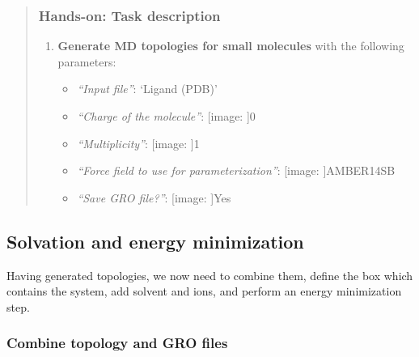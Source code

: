 \documentclass[twocolumn]{bmcart}%
\def\texttt{[image: ]}
\providecommand{\tightlist}{%
  \setlength{\itemsep}{0pt}\setlength{\parskip}{0pt}}
\begin{document}
\begin{quote}
\hypertarget{hands-on-task-description-2}{%
\subsubsection{Hands-on: Task
description}\label{hands-on-task-description-2}}

\begin{enumerate}
\def\labelenumi{\arabic{enumi}.}
\tightlist
\item
  \textbf{Generate MD topologies for small molecules} with the following
  parameters:

  \begin{itemize}
  \tightlist
  \item
    \emph{``Input file''}: `Ligand (PDB)'
  \item
    \emph{``Charge of the molecule''}: \texttt{0}
  \item
    \emph{``Multiplicity''}: \texttt{1}
  \item
    \emph{``Force field to use for parameterization''}:
    \texttt{AMBER14SB}
  \item
    \emph{``Save GRO file?''}: \texttt{Yes}
  \end{itemize}
\end{enumerate}


\end{quote}

\hypertarget{solvation-and-energy-minimization}{%
\subsection{Solvation and energy
minimization}\label{solvation-and-energy-minimization}}

Having generated topologies, we now need to combine them, define the box
which contains the system, add solvent and ions, and perform an energy
minimization step.

\hypertarget{combine-topology-and-gro-files}{%
\subsubsection{Combine topology and GRO
files}\label{combine-topology-and-gro-files}}
\end{document}
